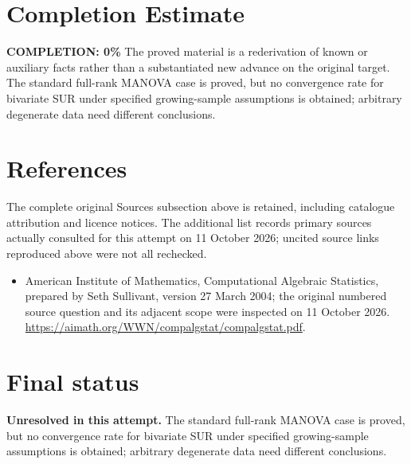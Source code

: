 \documentclass[11pt]{article}
\begin{document}
\section{Completion Estimate}
\noindent\textbf{COMPLETION: 0\%}
The proved material is a rederivation of known or auxiliary facts rather than a substantiated new advance on the original target. The standard full-rank MANOVA case is proved, but no convergence rate for bivariate SUR under specified growing-sample assumptions is obtained; arbitrary degenerate data need different conclusions.
\section{References}
The complete original Sources subsection above is retained, including catalogue attribution and licence notices. The additional list records primary sources actually consulted for this attempt on 11 October 2026; uncited source links reproduced above were not all rechecked.
\begin{itemize}
\item American Institute of Mathematics, Computational Algebraic Statistics, prepared by Seth Sullivant, version 27 March 2004; the original numbered source question and its adjacent scope were inspected on 11 October 2026. \url{https://aimath.org/WWN/compalgstat/compalgstat.pdf}.
\end{itemize}
\section{Final status}
\textbf{Unresolved in this attempt.} The standard full-rank MANOVA case is proved, but no convergence rate for bivariate SUR under specified growing-sample assumptions is obtained; arbitrary degenerate data need different conclusions.
\end{document}
